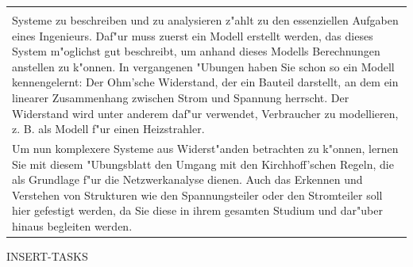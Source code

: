\documentclass[a4paper]{article}
\newenvironment{boxed2}
    {\begin{center}
    \begin{tabular}{|p{0.9\textwidth}|}
    \hline
    }
    { 
    \\\hline
    \end{tabular} 
    \end{center}
    }
\begin{document}
\pagestyle{empty} \enlargethispage*{25cm}
	
	\vspace*{1cm}
\begin{boxed2}
\begin{center}
 \textbf{Infobox zur Netzwerkanalyse}\\
Systeme zu beschreiben und zu analysieren z"ahlt zu den essenziellen Aufgaben eines Ingenieurs. Daf"ur muss zuerst ein Modell erstellt werden, das dieses System m"oglichst gut beschreibt, um anhand dieses Modells Berechnungen anstellen zu k"onnen. In vergangenen "Ubungen haben Sie schon so ein Modell kennengelernt: Der Ohm'sche Widerstand, der ein Bauteil darstellt, an dem ein linearer Zusammenhang zwischen Strom und Spannung herrscht.  Der Widerstand wird unter anderem daf"ur verwendet, Verbraucher zu modellieren, z. B. als Modell f"ur einen Heizstrahler.\\
Um nun komplexere Systeme aus Widerst"anden betrachten zu k"onnen, lernen Sie mit diesem "Ubungsblatt den Umgang mit den Kirchhoff'schen Regeln, die als Grundlage f"ur die Netzwerkanalyse dienen. Auch das Erkennen und Verstehen von Strukturen wie den Spannungsteiler oder den Stromteiler soll hier gefestigt werden, da Sie diese in ihrem gesamten Studium und dar"uber hinaus begleiten werden.
\end{center}
\end{boxed2}
	
INSERT-TASKS
\end{document}
